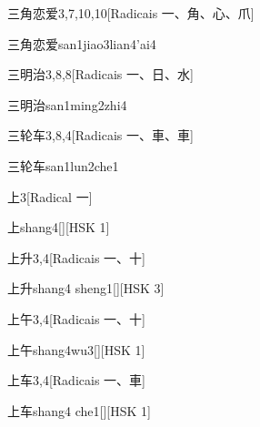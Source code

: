 \begin{entry}{三角恋爱}{3,7,10,10}[Radicais ⼀、⾓、⼼、⽖]
  \begin{phonetics}{三角恋爱}{san1jiao3lian4'ai4}
  \end{phonetics}
\end{entry}

\begin{entry}{三明治}{3,8,8}[Radicais ⼀、⽇、⽔]
  \begin{phonetics}{三明治}{san1ming2zhi4}
  \end{phonetics}
\end{entry}

\begin{entry}{三轮车}{3,8,4}[Radicais ⼀、⾞、⾞]
  \begin{phonetics}{三轮车}{san1lun2che1}
  \end{phonetics}
\end{entry}

\begin{entry}{上}{3}[Radical ⼀]
  \begin{phonetics}{上}{shang4}[][HSK 1]
  \end{phonetics}
\end{entry}

\begin{entry}{上升}{3,4}[Radicais ⼀、⼗]
  \begin{phonetics}{上升}{shang4 sheng1}[][HSK 3]
  \end{phonetics}
\end{entry}

\begin{entry}{上午}{3,4}[Radicais ⼀、⼗]
  \begin{phonetics}{上午}{shang4wu3}[][HSK 1]
  \end{phonetics}
\end{entry}

\begin{entry}{上车}{3,4}[Radicais ⼀、⾞]
  \begin{phonetics}{上车}{shang4 che1}[][HSK 1]
  \end{phonetics}
\end{entry}

